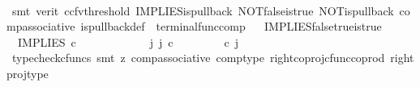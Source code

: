 \begin{isabellebody}
\ \ \ \ \isamarkupfalse%
\ {\isacharparenleft}{\kern0pt}smt\ {\isacharparenleft}{\kern0pt}verit{\isacharcomma}{\kern0pt}\ ccfv{\isacharunderscore}{\kern0pt}threshold{\isacharparenright}{\kern0pt}\ IMPLIES{\isacharunderscore}{\kern0pt}is{\isacharunderscore}{\kern0pt}pullback\ NOT{\isacharunderscore}{\kern0pt}false{\isacharunderscore}{\kern0pt}is{\isacharunderscore}{\kern0pt}true\ NOT{\isacharunderscore}{\kern0pt}is{\isacharunderscore}{\kern0pt}pullback\ comp{\isacharunderscore}{\kern0pt}associative{}\ is{\isacharunderscore}{\kern0pt}pullback{\isacharunderscore}{\kern0pt}def\ \ terminal{\isacharunderscore}{\kern0pt}func{\isacharunderscore}{\kern0pt}comp{\isacharparenright}{\kern0pt}\isanewline
{}\isamarkupfalse%
%
\endisatagproof
{\isafoldproof}%
%
\isadelimproof
\ \isanewline
%
\endisadelimproof
\isanewline
{}\isamarkupfalse%
\ IMPLIES{\isacharunderscore}{\kern0pt}false{\isacharunderscore}{\kern0pt}true{\isacharunderscore}{\kern0pt}is{\isacharunderscore}{\kern0pt}true{\isacharcolon}{\kern0pt}\isanewline
\ \ {\isachardoublequoteopen}IMPLIES\ {\isasymcirc}\isactrlsub c\ {\isasymlangle}{\isasymf}{\isacharcomma}{\kern0pt}{\isasymt}{\isasymrangle}\ {\isacharequal}{\kern0pt}\ {\isasymt}{\isachardoublequoteclose}\isanewline
%
\isadelimproof
%
\endisadelimproof
%
\isatagproof
{}\isamarkupfalse%
\ {\isacharminus}{\kern0pt}\ \ \ \isanewline
\ \ \isamarkupfalse%
\ {\isachardoublequoteopen}{\isasymexists}\ j{\isachardot}{\kern0pt}\ j\ {\isasymin}\isactrlsub c\ {\isasymone}{\isasymCoprod}{\isacharparenleft}{\kern0pt}{\isasymone}{\isasymCoprod}{\isasymone}{\isacharparenright}{\kern0pt}\ {\isasymand}\ {\isacharparenleft}{\kern0pt}{\isasymlangle}{\isasymt}{\isacharcomma}{\kern0pt}\ {\isasymt}{\isasymrangle}{\isasymamalg}\ {\isacharparenleft}{\kern0pt}{\isasymlangle}{\isasymf}{\isacharcomma}{\kern0pt}\ {\isasymf}{\isasymrangle}\ {\isasymamalg}{\isasymlangle}{\isasymf}{\isacharcomma}{\kern0pt}\ {\isasymt}{\isasymrangle}{\isacharparenright}{\kern0pt}{\isacharparenright}{\kern0pt}\ {\isasymcirc}\isactrlsub c\ j\ \ {\isacharequal}{\kern0pt}\ {\isasymlangle}{\isasymf}{\isacharcomma}{\kern0pt}{\isasymt}{\isasymrangle}{\isachardoublequoteclose}\isanewline
\ \ \ \ \isamarkupfalse%
\ {\isacharparenleft}{\kern0pt}typecheck{\isacharunderscore}{\kern0pt}cfuncs{\isacharcomma}{\kern0pt}\ smt\ {\isacharparenleft}{\kern0pt}z{}{\isacharparenright}{\kern0pt}\ comp{\isacharunderscore}{\kern0pt}associative{}\ comp{\isacharunderscore}{\kern0pt}type\ right{\isacharunderscore}{\kern0pt}coproj{\isacharunderscore}{\kern0pt}cfunc{\isacharunderscore}{\kern0pt}coprod\ right{\isacharunderscore}{\kern0pt}proj{\isacharunderscore}{\kern0pt}type{\isacharparenright}{\kern0pt}\isanewline

\end{isabellebody}
